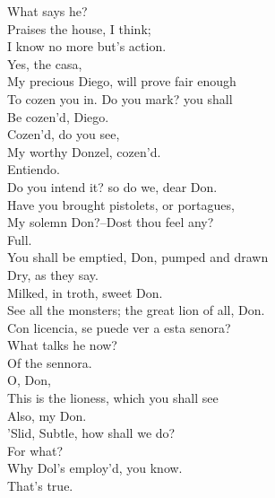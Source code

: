 \documentclass{memoir}
\begin{document}
\begin{drama*}
\subtlespeaks  What says he?\\
\facespeaks {} Praises the house, I think;\\
 I know no more but's action.\\
\subtlespeaks {} Yes, the casa,\\
 My precious Diego, will prove fair enough\\
 To cozen you in. Do you mark? you shall\\
 Be cozen'd, Diego.\\
\facespeaks {} Cozen'd, do you see,\\
 My worthy Donzel, cozen'd.\\
\surlyspeaks {} Entiendo.\\
\subtlespeaks  Do you intend it? so do we, dear Don.\\
 Have you brought pistolets, or portagues,\\
 My solemn Don?--Dost thou feel any?\\
\facespeaks {} Full.\\
\subtlespeaks {} You shall be emptied, Don, pumped and drawn\\
 Dry, as they say.\\
\facespeaks {} Milked, in troth, sweet Don.\\
\subtlespeaks {} See all the monsters; the great lion of all, Don.\\
\surlyspeaks  Con licencia, se puede ver a esta senora?\\
\subtlespeaks  What talks he now?\\
\facespeaks {} Of the sennora.\\
\subtlespeaks {} O, Don,\\
 This is the lioness, which you shall see\\
 Also, my Don.\\
\facespeaks {} 'Slid, Subtle, how shall we do?\\
\subtlespeaks  For what?\\
\facespeaks {} Why Dol's employ'd, you know.\\
\subtlespeaks {} That's true.\\

\end{drama*}
\end{document}
